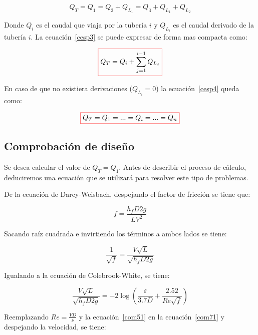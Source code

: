\documentclass[11pt, oneside]{article}
\begin{document}
\begin{itemize}
\begin{equation}
Q_T = Q_1 = Q_2 + Q_{L_1} = Q_3 + Q_{L_1} + Q_{L_2}
\label{cesp3}
\end{equation}

Donde $Q_i$ es el caudal que viaja por la tuber\'ia $i$ y $Q_{L_i}$ es el caudal derivado de la tuber\'ia $i$. La ecuaci\'on~\ref{cesp3} se puede expresar de forma mas compacta como:

\begin{equation}
\color{red}\boxed{\color{black} Q_T = Q_i + \sum_{j=1}^{i-1} Q_{L_j} }
\label{cesp4}
\end{equation}

En caso de que no existiera derivaciones ($Q_{L_i} = 0$) la ecuaci\'on~\ref{cesp4} queda como:

\begin{equation}
\color{red}\boxed{\color{black} Q_T = Q_1 = ...= Q_i = ...  = Q_n }
\label{cesp5}
\end{equation}

\end{itemize}

\subsection{Comprobaci\'on de dise\~no}
Se desea calcular el valor de $Q_T = Q_1$. Antes de describir el proceso de c\'alculo, deduciremos una ecuaci\'on que se utilizar\'a para resolver este tipo de problemas. 

De la ecuaci\'on de Darcy-Weisbach, despejando el factor de fricci\'on se tiene que:

\begin{equation}
f = \frac{h_f D 2g}{L V^2}
\label{com41}
\end{equation}

Sacando ra\'iz cuadrada e invirtiendo los t\'erminos a ambos lados se tiene:

\begin{equation}
\frac{1}{\sqrt{f}} = \frac{V\sqrt{L}}{\sqrt{h_f D 2g}}
\label{com51}
\end{equation}

Igualando a la ecuaci\'on de Colebrook-White, se tiene:

\begin{equation}
\frac{V\sqrt{L}}{\sqrt{h_f D 2g}}= -2 \log \left( \frac{\varepsilon}{3.7D} + \frac{2.52}{Re \sqrt{f}} \right) 
\label{com71}
\end{equation}

Reemplazando $Re = \frac{VD}{\nu}$ y la ecuaci\'on~\ref{com51} en la ecuaci\'on~\ref{com71} y despejando la velocidad, se tiene:
\end{document}
